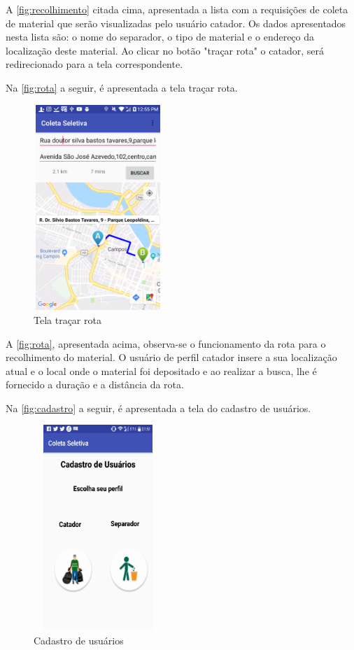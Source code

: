 A \autoref{fig:recolhimento} citada cima, apresentada a lista com a requisições de coleta de material que serão visualizadas pelo usuário catador. Os dados apresentados nesta lista são: o nome do separador, o tipo de material e o endereço da localização deste material. Ao clicar no botão "traçar rota" o catador, será redirecionado para a tela correspondente.

Na \autoref{fig:rota} a seguir, é apresentada a tela traçar rota. 

\begin{figure}[H]
	\begin{Center}
		\includegraphics[width=1.92in,height=3.06in]{./media/image43.png}
	\end{Center}
	\caption{Tela traçar rota}
	\label{fig:rota}
\end{figure}

A \autoref{fig:rota}, apresentada acima, observa-se o funcionamento da rota para o recolhimento do material. O usuário de perfil catador insere a sua localização atual e o local onde o material foi depositado e ao realizar a busca, lhe é fornecido a duração e a distância da rota.

Na \autoref{fig:cadastro} a seguir, é apresentada a tela do cadastro de usuários.

\begin{figure}[H]
	\begin{Center}
		\includegraphics[width=1.92in,height=3.06in]{./media/image41.png}
	\end{Center}
	\caption{Cadastro de usuários}
	\label{fig:cadastro}
\end{figure}

